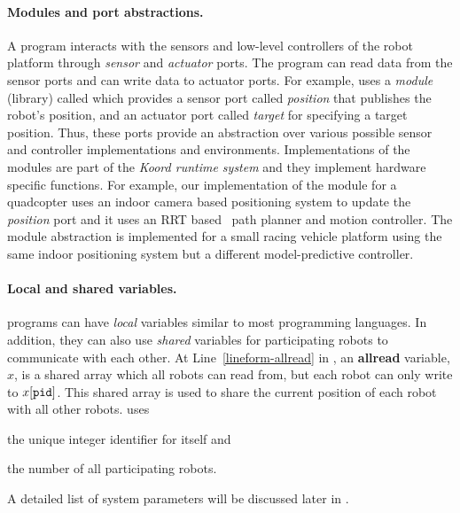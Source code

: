 \paragraph{Modules and port abstractions.}
A \lgname program interacts with the sensors and low-level controllers of the robot platform through \emph{sensor} and \emph{actuator} ports.
%
%
The program can read data from the sensor ports and can write data to actuator ports.
%
For example, \LineForm uses a \emph{module} (library) called \Motion which provides a sensor port called \emph{position} that publishes the robot's position, and an actuator port called \emph{target} for specifying a target position.
%
Thus, these  ports provide an abstraction over various possible sensor and controller implementations and environments.
%
Implementations of the modules are part of the {\em Koord runtime system\/} and they implement hardware specific functions.
For example, our implementation of the \Motion module for a quadcopter uses an indoor camera based positioning system to update the \emph{position} port and it uses an RRT based~\cite{} path planner and motion controller.
%
The \Motion module abstraction is implemented for a small racing vehicle platform using the same indoor positioning system but a different model-predictive controller.


%
%

\paragraph{Local and shared variables.}
\lgname programs can have  \emph{local} variables similar to most programming languages.
In addition, they can also use \emph{shared} variables for participating robots to communicate with each other.
At Line~\ref{lineform-allread} in ,
an \textbf{allread} variable, $x$, is a shared array which all robots can read from,
but each robot \myuin can only write to $x[\texttt{pid}]$.
This shared array is used to share the current position of each robot with all other robots.
\LineForm uses
\begin{inparaenum}[(a)]
    \item the unique integer identifier \myuin for itself and
    \item the number \NMAX of all participating robots.
\end{inparaenum}
A detailed list of system parameters will be discussed later in .

